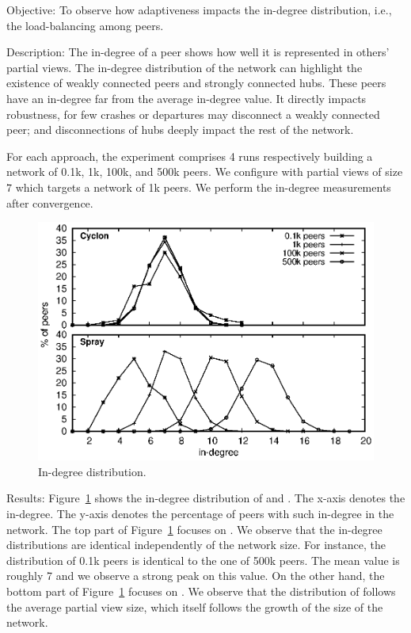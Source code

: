 \begin{asparadesc}
\item[Objective:] To observe how adaptiveness impacts the in-degree
  distribution, i.e., the load-balancing among peers.
\item[Description:] The in-degree of a peer shows how well it is represented in
  others' partial views. The in-degree distribution of the network can highlight
  the existence of weakly connected peers and strongly connected hubs. These
  peers have an in-degree far from the average in-degree value. It directly
  impacts robustness, for few crashes or departures may disconnect a weakly
  connected peer; and disconnections of hubs deeply impact the rest of the
  network.

  For each approach, the experiment comprises 4 runs respectively building a
  network of 0.1k, 1k, 100k, and 500k peers. We configure \CYCLON with partial
  views of size $7$ which targets a network of 1k peers.  We perform the
  in-degree measurements after convergence.

\begin{figure}
  \centering
  \includegraphics[width=\SCALE\textwidth]{img/histo.eps}
  \caption{\label{fig:histo}In-degree distribution.}
\end{figure}

\item[Results:] Figure~\ref{fig:histo} shows the in-degree distribution of
  \CYCLON and \SPRAY. The x-axis denotes the in-degree. The y-axis denotes the
  percentage of peers with such in-degree in the network. The top part of
  Figure~\ref{fig:histo} focuses on \CYCLON. We observe that the in-degree
  distributions are identical independently of the network size. For instance,
  the distribution of 0.1k peers is identical to the one of 500k peers. The mean
  value is roughly 7 and we observe a strong peak on this value. On the other
  hand, the bottom part of Figure~\ref{fig:histo} focuses on \SPRAY. We observe
  that the distribution of \SPRAY follows the average partial view size, which
  itself follows the growth of the size of the network.


\end{asparadesc}
